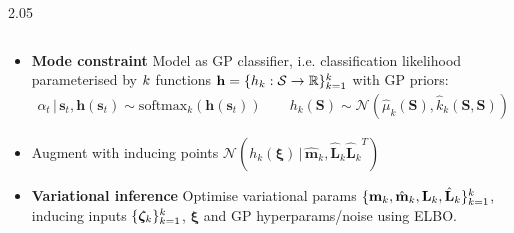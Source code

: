 \documentclass[final,11pt]{beamer}
\newlength{\colwidth}
\newcommand{\R}{\mathbb{R}}    %
\renewcommand{\mid}{\,|\,}
\DeclareMathOperator{\R}{\mathbb{R}}
\newcommand{\numData}{\ensuremath{t}}
\newcommand{\modeInd}{\ensuremath{k}}
\newcommand{\ModeInd}{\ensuremath{\MakeUppercase{\modeInd}}}
\newcommand{\allData}[1]{\ensuremath{\MakeUppercase{#1}}}
\newcommand{\mode}[1]{\ensuremath{#1_{\modeInd}}}
\newcommand{\state}{\ensuremath{\mathbf{x}}}
\newcommand{\x}{\ensuremath{\mathbf{x}}}
\newcommand{\singleInput}{\ensuremath{\x_{\numData-1}}}
\newcommand{\allInput}{\ensuremath{\allData{\x}}}
\newcommand{\modeVar}{\ensuremath{\alpha}}
\newcommand{\gatingFunc}{\ensuremath{h}}
\newcommand{\GatingFunc}{\ensuremath{\mathbf{\gatingFunc}}}
\newcommand{\latentFunc}{\ensuremath{f}}
\newcommand{\timeInd}{\ensuremath{t}}
\newcommand{\TimeInd}{\ensuremath{\MakeUppercase{\timeInd}}}
\renewcommand{\allInput}{\ensuremath{\hat{\state}_{1:\TimeInd}}}
\newcommand{\stateDomain}{\ensuremath{\mathcal{S}}}
\renewcommand{\state}{\ensuremath{\mathbf{s}}}
\renewcommand{\mode}[1]{\ensuremath{#1_{\modeInd}}}
\renewcommand{\numData}{\ensuremath{n}}
\renewcommand{\singleInput}{\ensuremath{\mathbf{x}_{\numData}}}
\renewcommand{\allInput}{\ensuremath{\mathbf{X}}}
\newcommand{\singleInputK}{\ensuremath{\mathbf{x}_{\numData, \modeInd}}}
\newcommand{\allInputK}{\ensuremath{\mode{\allInput}}}
\newcommand{\gatingMeanFunc}{\ensuremath{\mode{\hat{\mu}}}}
\newcommand{\gatingCovFunc}{\ensuremath{\mode{\hat{k}}}}
\newcommand{\expertInducingInput}{\ensuremath{\mode{\bm{\zeta}}}}
\newcommand{\gatingInducingInput}{\ensuremath{\bm{\xi}}}
\newcommand{\gatingInducingOutput}{\ensuremath{\mode{\gatingFunc}(\gatingInducingInput)}}
\renewcommand{\numData}{\ensuremath{t}}
\renewcommand{\allInput}{\ensuremath{\hat{\mathbf{S}}}}
\renewcommand{\allInputK}{\ensuremath{\mode{\hat{\mathbf{S}}}}}
\renewcommand{\singleInput}{\ensuremath{\hat{\mathbf{s}}_{\timeInd}}}
\begin{document}
\begin{frame}[t]
\begin{columns}[t]
\begin{column}{2.05\colwidth}
\begin{columns}[t]
\begin{column}{\colwidth}
\begin{itemize}

      \item \textbf{Mode constraint} Model as GP classifier, i.e. classification
            likelihood parameterised by $\ModeInd$ functions $\GatingFunc = \{ \mode{\gatingFunc}: \stateDomain \rightarrow \R \}_{\modeInd=1}^{\ModeInd}$ with GP priors:
        \begin{align}
          \modeVar_{t} \mid \state_{t}, \GatingFunc(\state_{t}) \sim \text{softmax}_{\modeInd}(\GatingFunc(\state_{t}))
          \qquad
          \mode{\gatingFunc}(\mathbf{S}) \sim  \mathcal{N} \left(\mode{\hat{\mu}}(\mathbf{S}), \mode{\hat{k}}(\mathbf{S},\mathbf{S}) \right)
        \end{align}
        \item Augment with inducing points $\mathcal{N}(\gatingInducingOutput \mid \mode{\hat{\mathbf{m}}}, \mode{\hat{\mathbf{L}}} \mode{\hat{\mathbf{L}}}^{T})$
        \item \textbf{Variational inference} Optimise variational params $\{\mode{\mathbf{m}}, \mode{\hat{\mathbf{m}}}, \mode{\mathbf{L}}, \mode{\hat{\mathbf{L}}} \}_{\modeInd=1}^{\ModeInd}$,
        inducing inputs $\{\expertInducingInput\}_{\modeInd=1}^{\ModeInd}$, $\gatingInducingInput$ and GP hyperparams/noise using ELBO.

\end{itemize}
\end{column}
\end{columns}
\end{column}
\end{columns}
\end{frame}
\end{document}
